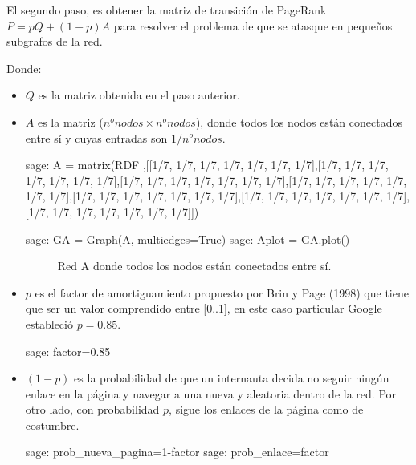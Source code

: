 \par El segundo paso, es obtener la matriz de transición de PageRank $P=pQ + (1-p)A$ para resolver el 
problema de que se atasque en pequeños subgrafos de la red.
\par Donde:
\begin{itemize}
    \item $Q$ es la matriz obtenida en el paso anterior.
    \item $A$ es la matriz ($n^onodos \times n^onodos$), donde todos los nodos están conectados entre sí y cuyas 
    entradas son $1/n^o nodos$.
    \begin{sagecommandline}
        sage: A = matrix(RDF ,[[1/7, 1/7, 1/7, 1/7, 1/7, 1/7, 1/7],[1/7, 1/7, 1/7, 1/7, 1/7, 1/7, 1/7],[1/7, 1/7, 1/7, 1/7, 1/7, 1/7, 1/7],[1/7, 1/7, 1/7, 1/7, 1/7, 1/7, 1/7],[1/7, 1/7, 1/7, 1/7, 1/7, 1/7, 1/7],[1/7, 1/7, 1/7, 1/7, 1/7, 1/7, 1/7],[1/7, 1/7, 1/7, 1/7, 1/7, 1/7, 1/7]])
    \end{sagecommandline} 
    \begin{sagecommandline}
        sage: GA = Graph(A, multiedges=True)
        sage: Aplot = GA.plot()
    \end{sagecommandline}
    
    \begin{figure}[H]
        \centering
        \label{redA}
        \caption{Red A donde todos los nodos están conectados entre sí.}
    \end{figure}
    \item $p$ es el factor de amortiguamiento propuesto por Brin y Page (1998) que tiene que ser un valor 
    comprendido entre [0..1], en este caso particular Google estableció $p=0.85$.
    \begin{sagecommandline}
        sage: factor=0.85
    \end{sagecommandline}
    \item  $(1-p)$ es la probabilidad de que un internauta decida no seguir ningún enlace en la página y 
    navegar a una nueva y aleatoria dentro de la red. Por otro lado, con probabilidad $p$, sigue los enlaces de 
    la página como de costumbre.
    \begin{sagecommandline}
        sage: prob_nueva_pagina=1-factor
        sage: prob_enlace=factor
    \end{sagecommandline}
\end{itemize}

